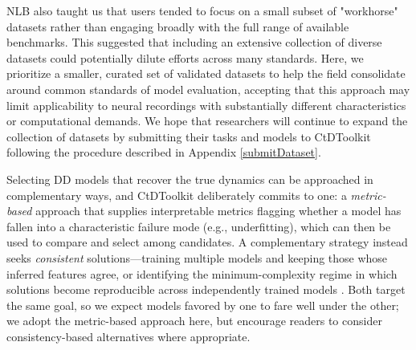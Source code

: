 \documentclass{article}
\begin{document}
NLB also taught us that users tended to focus on a small subset of "workhorse" datasets rather than engaging broadly with the full range of available benchmarks. This suggested that including an extensive collection of diverse datasets could potentially dilute efforts across many standards. Here, we prioritize a smaller, curated set of validated datasets to help the field consolidate around common standards of model evaluation, accepting that this approach may limit applicability to neural recordings with substantially different characteristics or computational demands. We hope that researchers will continue to expand the collection of datasets by submitting their tasks and models to CtDToolkit following the procedure described in Appendix \ref{submitDataset}.

Selecting DD models that recover the true dynamics can be approached in complementary ways, and CtDToolkit deliberately commits to one: a \textit{metric-based} approach that supplies interpretable metrics flagging whether a model has fallen into a characteristic failure mode (e.g., underfitting), which can then be used to compare and select among candidates. A complementary strategy instead seeks \textit{consistent} solutions---training multiple models and keeping those whose inferred features agree, or identifying the minimum-complexity regime in which solutions become reproducible across independently trained models \cite{Genkin2020-ow}. Both target the same goal, so we expect models favored by one to fare well under the other; we adopt the metric-based approach here, but encourage readers to consider consistency-based alternatives where appropriate.
\end{document}
